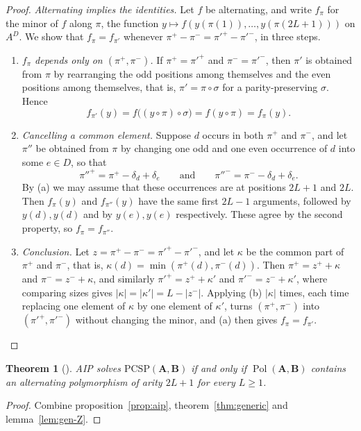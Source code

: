 \documentclass[11pt]{article}
\theoremstyle{plain}
\newtheorem{theorem}{Theorem}[section]
\theoremstyle{definition}
\newcommand{\Pol}{\operatorname{Pol}}
\newcommand{\bA}{\mathbf{A}}
\newcommand{\bB}{\mathbf{B}}
\newcommand{\PCSP}{\mathrm{PCSP}}
\newcommand{\pip}{{\pi'}}
\begin{document}
\begin{proof}
\emph{Alternating implies the identities.} Let $f$ be alternating, and write $f_\pi$ for the minor of $f$ along $\pi$, the function $y\mapsto f(y(\pi(1)),\dots,y(\pi(2L+1)))$ on $A^D$. We show that $f_\pi=f_\pip$ whenever $\pi^+-\pi^-=\pip^+-\pip^-$, in three steps.
\begin{enumerate}[label=(\alph*)]
  \item \emph{$f_\pi$ depends only on $(\pi^+,\pi^-)$.} If $\pi^+=\pip^+$ and $\pi^-=\pip^-$, then $\pi'$ is obtained from $\pi$ by rearranging the odd positions among themselves and the even positions among themselves, that is, $\pi'=\pi\circ\sigma$ for a parity-preserving $\sigma$. Hence
  \[
  f_\pip(y)=f\big((y\circ\pi)\circ\sigma\big)=f(y\circ\pi)=f_\pi(y).
  \]
  \item \emph{Cancelling a common element.} Suppose $d$ occurs in both $\pi^+$ and $\pi^-$, and let $\pi''$ be obtained from $\pi$ by changing one odd and one even occurrence of $d$ into some $e\in D$, so that
  \[
  {\pi''}^+=\pi^+-\delta_d+\delta_e\qquad\text{and}\qquad{\pi''}^-=\pi^--\delta_d+\delta_e.
  \]
  By (a) we may assume that these occurrences are at positions $2L+1$ and $2L$. Then $f_\pi(y)$ and $f_{\pi''}(y)$ have the same first $2L-1$ arguments, followed by $y(d),y(d)$ and by $y(e),y(e)$ respectively. These agree by the second property, so $f_\pi=f_{\pi''}$.
  \item \emph{Conclusion.} Let $z=\pi^+-\pi^-=\pip^+-\pip^-$, and let $\kappa$ be the common part of $\pi^+$ and $\pi^-$, that is, $\kappa(d)=\min(\pi^+(d),\pi^-(d))$. Then $\pi^+=z^++\kappa$ and $\pi^-=z^-+\kappa$, and similarly $\pip^+=z^++\kappa'$ and $\pip^-=z^-+\kappa'$, where comparing sizes gives $|\kappa|=|\kappa'|=L-|z^-|$. Applying (b) $|\kappa|$ times, each time replacing one element of $\kappa$ by one element of $\kappa'$, turns $(\pi^+,\pi^-)$ into $(\pip^+,\pip^-)$ without changing the minor, and (a) then gives $f_\pi=f_\pip$.\qedhere
\end{enumerate}
\end{proof}

\begin{theorem}[\cite{BBKO}]\label{thm:aip}
AIP solves $\PCSP(\bA,\bB)$ if and only if $\Pol(\bA,\bB)$ contains an alternating polymorphism of arity $2L+1$ for every $L\geq1$.
\end{theorem}

\begin{proof}
Combine proposition~\ref{prop:aip}, theorem~\ref{thm:generic} and lemma~\ref{lem:gen-Z}.
\end{proof}
\end{document}
